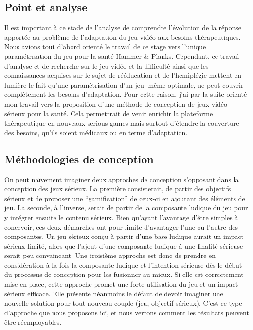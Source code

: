 	
	
	
	\subsection*{Point et analyse}
Il est important à ce stade de l'analyse de comprendre l'évolution de la réponse apportée au problème de l'adaptation du jeu vidéo aux besoins thérapeutiques. Nous avions tout d'abord orienté le travail de ce stage vers l'unique paramétrisation du jeu pour la santé Hammer \& Planks. Cependant, ce travail d'analyse et de recherche sur le jeu vidéo et  la difficulté ainsi que les connaissances acquises sur le sujet de rééducation et de l'hémiplégie mettent en lumière le fait qu'une paramétrisation d'un jeu, même optimale, ne peut couvrir complètement les besoins d'adaptation. Pour cette raison, j'ai par la suite orienté mon travail vers la proposition d'une méthode de conception de jeux vidéo sérieux pour la santé. Cela permettrait de venir enrichir la plateforme thérapeutique en nouveaux serious games mais surtout d'étendre la couverture des besoins, qu'ils soient médicaux ou en terme d'adaptation.

	\subsection{Méthodologies de conception}
On peut naïvement imaginer deux approches de conception s’opposant dans la conception des jeux sérieux. La première consisterait, de partir des objectifs sérieux et de proposer une “gamification” de ceux-ci en ajoutant des éléments de jeu. La seconde, à l’inverse, serait de partir de la composante ludique du jeu pour y intégrer ensuite le contenu sérieux. Bien qu’ayant l’avantage d’être simples à concevoir, ces deux démarches ont pour limite d’avantager l’une ou l’autre des composantes. Un jeu sérieux conçu à partir d’une base ludique aurait un impact sérieux limité, alors que l’ajout d’une composante ludique à une finalité sérieuse serait peu convaincant.
Une troisième approche est donc de prendre en considération à la fois la composante ludique et l’intention sérieuse dès le début du processus de conception pour les fusionner au mieux. Si elle est correctement mise en place, cette approche promet une forte utilisation du jeu et un impact sérieux efficace. Elle présente néanmoins le défaut de devoir imaginer une nouvelle solution pour tout nouveau couple (jeu, objectif sérieux). C’est ce type d’approche que nous proposons ici, et nous verrons comment les résultats peuvent être réemployables.

